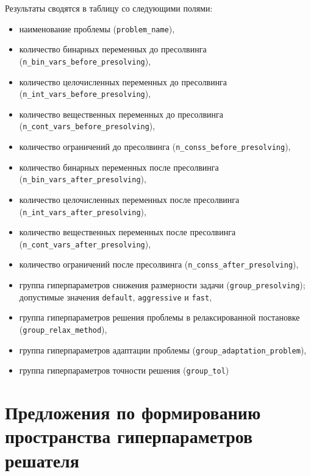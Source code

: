 \documentclass[%
	11pt,
	a4paper,
	utf8,
		]{article}
\begin{document}
Результаты сводятся в таблицу со следующими полями:
\begin{itemize}
	\item наименование проблемы (\verb|problem_name|),
	
	\item количество бинарных переменных до пресолвинга (\verb|n_bin_vars_before_presolving|),
	
	\item количество целочисленных переменных до пресолвинга (\verb|n_int_vars_before_presolving|),
	
	\item количество вещественных переменных до пресолвинга (\verb|n_cont_vars_before_presolving|),
	
	\item количество ограничений до пресолвинга (\verb|n_conss_before_presolving|),
	
	\item количество бинарных переменных после пресолвинга (\verb|n_bin_vars_after_presolving|),
	
	\item количество целочисленных переменных после пресолвинга (\verb|n_int_vars_after_presolving|),
	
	\item количество вещественных переменных после пресолвинга (\verb|n_cont_vars_after_presolving|),
	
	\item количество ограничений после пресолвинга (\verb|n_conss_after_presolving|),
	
	\item группа гиперпараметров снижения размерности задачи (\verb|group_presolving|); допустимые значения \verb|default|, \verb|aggressive| и \verb|fast|,
	
	\item группа гиперпараметров решения проблемы в релаксированной постановке (\verb|group_relax_method|),
	
	\item группа гиперпараметров адаптации проблемы (\verb|group_adaptation_problem|),
	
	\item группа гиперпараметров точности решения (\verb|group_tol|)
\end{itemize}

\section{Предложения по формированию пространства гиперпараметров решателя}
\end{document}
